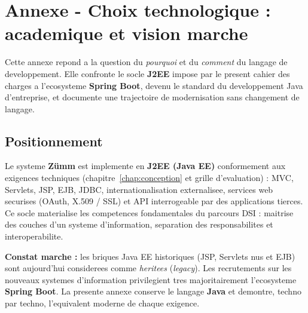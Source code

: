 
\chapter{Annexe - Choix technologique : academique et vision marche}
\label{chap:migration}
Cette annexe repond a la question du \emph{pourquoi} et du \emph{comment} du
langage de developpement. Elle confronte le socle \textbf{J2EE} impose par le
present cahier des charges a l'ecosysteme \textbf{Spring Boot}, devenu le
standard du developpement Java d'entreprise, et documente une trajectoire de
modernisation sans changement de langage.

\section{Positionnement}
Le systeme \textbf{Z\"umm} est implemente en \textbf{J2EE (Java EE)}
conformement aux exigences techniques (chapitre~\ref{chap:conception} et grille
d'evaluation) : MVC, Servlets, JSP, EJB, JDBC, internationalisation
externalisee, services web securises (OAuth, X.509 / SSL) et API interrogeable
par des applications tierces. Ce socle materialise les competences fondamentales
du parcours DSI : maitrise des couches d'un systeme d'information, separation des
responsabilites et interoperabilite.

\begin{encadre}
\textbf{Constat marche :} les briques Java EE historiques (JSP, Servlets
\og nus \fg{} et EJB) sont aujourd'hui considerees comme \emph{heritees}
(\emph{legacy}). Les recrutements sur les nouveaux systemes d'information
privilegient tres majoritairement l'ecosysteme \textbf{Spring Boot}. La presente
annexe conserve le langage \textbf{Java} et demontre, techno par techno,
l'equivalent moderne de chaque exigence.
\end{encadre}


